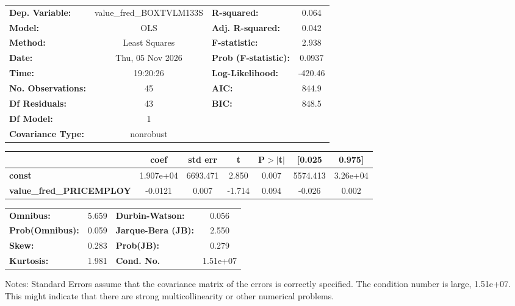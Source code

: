 \begin{center}
\begin{tabular}{lclc}
\toprule
\textbf{Dep. Variable:}          & value\_fred\_BOXTVLM133S & \textbf{  R-squared:         } &     0.064   \\
\textbf{Model:}                  &           OLS            & \textbf{  Adj. R-squared:    } &     0.042   \\
\textbf{Method:}                 &      Least Squares       & \textbf{  F-statistic:       } &     2.938   \\
\textbf{Date:}                   &     Thu, 05 Nov 2026     & \textbf{  Prob (F-statistic):} &   0.0937    \\
\textbf{Time:}                   &         19:20:26         & \textbf{  Log-Likelihood:    } &   -420.46   \\
\textbf{No. Observations:}       &              45          & \textbf{  AIC:               } &     844.9   \\
\textbf{Df Residuals:}           &              43          & \textbf{  BIC:               } &     848.5   \\
\textbf{Df Model:}               &               1          & \textbf{                     } &             \\
\textbf{Covariance Type:}        &        nonrobust         & \textbf{                     } &             \\
\bottomrule
\end{tabular}
\begin{tabular}{lcccccc}
                                 & \textbf{coef} & \textbf{std err} & \textbf{t} & \textbf{P$> |$t$|$} & \textbf{[0.025} & \textbf{0.975]}  \\
\midrule
\textbf{const}                   &    1.907e+04  &     6693.471     &     2.850  &         0.007        &     5574.413    &     3.26e+04     \\
\textbf{value\_fred\_PRICEMPLOY} &      -0.0121  &        0.007     &    -1.714  &         0.094        &       -0.026    &        0.002     \\
\bottomrule
\end{tabular}
\begin{tabular}{lclc}
\textbf{Omnibus:}       &  5.659 & \textbf{  Durbin-Watson:     } &    0.056  \\
\textbf{Prob(Omnibus):} &  0.059 & \textbf{  Jarque-Bera (JB):  } &    2.550  \\
\textbf{Skew:}          &  0.283 & \textbf{  Prob(JB):          } &    0.279  \\
\textbf{Kurtosis:}      &  1.981 & \textbf{  Cond. No.          } & 1.51e+07  \\
\bottomrule
\end{tabular}
\end{center}

Notes: \newline
 [1] Standard Errors assume that the covariance matrix of the errors is correctly specified. \newline
 [2] The condition number is large, 1.51e+07. This might indicate that there are \newline
 strong multicollinearity or other numerical problems.